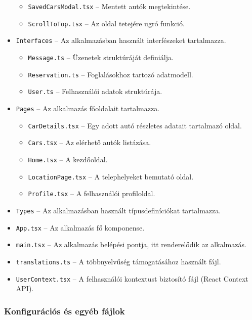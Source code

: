 \documentclass{report}[11pt]
\begin{document}
\begin{itemize}
\begin{itemize}
        \item \texttt{SavedCarsModal.tsx} – Mentett autók megtekintése.
        \item \texttt{ScrollToTop.tsx} – Az oldal tetejére ugró funkció.
    \end{itemize}
    \item \texttt{Interfaces} – Az alkalmazásban használt interfészeket tartalmazza.
    \begin{itemize}
        \item \texttt{Message.ts} – Üzenetek struktúráját definiálja.
        \item \texttt{Reservation.ts} – Foglalásokhoz tartozó adatmodell.
        \item \texttt{User.ts} – Felhasználói adatok struktúrája.
    \end{itemize}
    \item \texttt{Pages} – Az alkalmazás főoldalait tartalmazza.
    \begin{itemize}
        \item \texttt{CarDetails.tsx} – Egy adott autó részletes adatait tartalmazó oldal.
        \item \texttt{Cars.tsx} – Az elérhető autók listázása.
        \item \texttt{Home.tsx} – A kezdőoldal.
        \item \texttt{LocationPage.tsx} – A telephelyeket bemutató oldal.
        \item \texttt{Profile.tsx} – A felhasználói profiloldal.
    \end{itemize}
    \item \texttt{Types} – Az alkalmazásban használt típusdefiníciókat tartalmazza.
    \item \texttt{App.tsx} – Az alkalmazás fő komponense.
    \item \texttt{main.tsx} – Az alkalmazás belépési pontja, itt renderelődik az alkalmazás.
    \item \texttt{translations.ts} – A többnyelvűség támogatásához használt fájl.
    \item \texttt{UserContext.tsx} – A felhasználói kontextust biztosító fájl (React Context API).
\end{itemize}

\subsubsection{Konfigurációs és egyéb fájlok}
\end{document}
